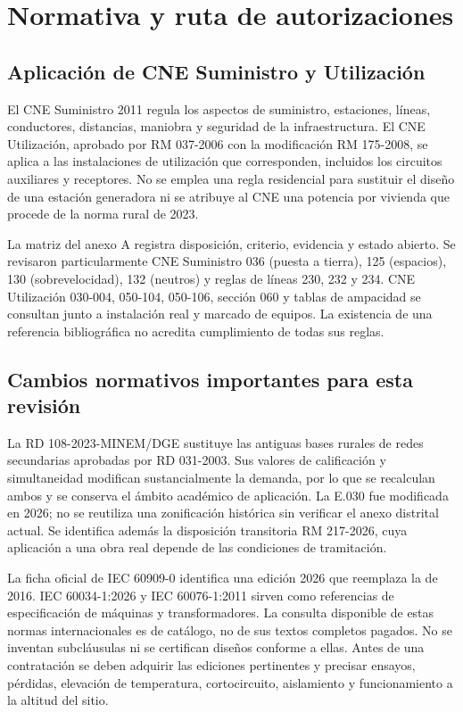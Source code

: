 \chapter{Normativa y ruta de autorizaciones}
\section{Aplicación de CNE Suministro y Utilización}
El CNE Suministro 2011 regula los aspectos de suministro, estaciones, líneas, conductores, distancias, maniobra y seguridad de la infraestructura. El CNE Utilización, aprobado por RM 037-2006 con la modificación RM 175-2008, se aplica a las instalaciones de utilización que corresponden, incluidos los circuitos auxiliares y receptores. No se emplea una regla residencial para sustituir el diseño de una estación generadora ni se atribuye al CNE una potencia por vivienda que procede de la norma rural de 2023.

La matriz del anexo A registra disposición, criterio, evidencia y estado abierto. Se revisaron particularmente CNE Suministro 036 (puesta a tierra), 125 (espacios), 130 (sobrevelocidad), 132 (neutros) y reglas de líneas 230, 232 y 234. CNE Utilización 030-004, 050-104, 050-106, sección 060 y tablas de ampacidad se consultan junto a instalación real y marcado de equipos. La existencia de una referencia bibliográfica no acredita cumplimiento de todas sus reglas.

\section{Cambios normativos importantes para esta revisión}
La RD 108-2023-MINEM/DGE sustituye las antiguas bases rurales de redes secundarias aprobadas por RD 031-2003. Sus valores de calificación y simultaneidad modifican sustancialmente la demanda, por lo que se recalculan ambos y se conserva el ámbito académico de aplicación. La E.030 fue modificada en 2026; no se reutiliza una zonificación histórica sin verificar el anexo distrital actual. Se identifica además la disposición transitoria RM 217-2026, cuya aplicación a una obra real depende de las condiciones de tramitación.

La ficha oficial de IEC 60909-0 identifica una edición 2026 que reemplaza la de 2016. IEC 60034-1:2026 y IEC 60076-1:2011 sirven como referencias de especificación de máquinas y transformadores. La consulta disponible de estas normas internacionales es de catálogo, no de sus textos completos pagados. No se inventan subcláusulas ni se certifican diseños conforme a ellas. Antes de una contratación se deben adquirir las ediciones pertinentes y precisar ensayos, pérdidas, elevación de temperatura, cortocircuito, aislamiento y funcionamiento a la altitud del sitio.

